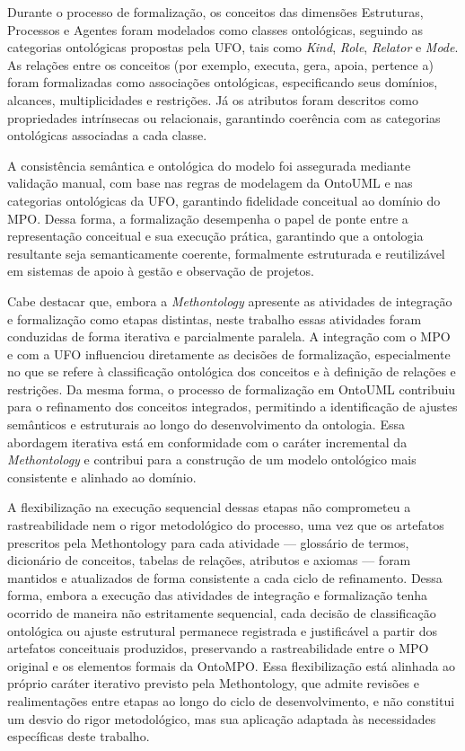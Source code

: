 Durante o processo de formalização, os conceitos das dimensões Estruturas, Processos e Agentes foram modelados como classes ontológicas, seguindo as categorias ontológicas propostas pela UFO, tais como \textit{Kind}, \textit{Role}, \textit{Relator} e \textit{Mode}. As relações entre os conceitos (por exemplo, executa, gera, apoia, pertence a) foram formalizadas como associações ontológicas, especificando seus domínios, alcances, multiplicidades e restrições. Já os atributos foram descritos como propriedades intrínsecas ou relacionais, garantindo coerência com as categorias ontológicas associadas a cada classe.

A consistência semântica e ontológica do modelo foi assegurada mediante validação manual, com base nas regras de modelagem da OntoUML e nas categorias ontológicas da UFO, garantindo fidelidade conceitual ao domínio do MPO. Dessa forma, a formalização desempenha o papel de ponte entre a representação conceitual e sua execução prática, garantindo que a ontologia resultante seja semanticamente coerente, formalmente estruturada e reutilizável em sistemas de apoio à gestão e observação de projetos.

Cabe destacar que, embora a \textit{Methontology} apresente as atividades de integração e formalização como etapas distintas, neste trabalho essas atividades foram conduzidas de forma iterativa e parcialmente paralela. A integração com o MPO e com a UFO influenciou diretamente as decisões de formalização, especialmente no que se refere à classificação ontológica dos conceitos e à definição de relações e restrições. Da mesma forma, o processo de formalização em OntoUML contribuiu para o refinamento dos conceitos integrados, permitindo a identificação de ajustes semânticos e estruturais ao longo do desenvolvimento da ontologia. Essa abordagem iterativa está em conformidade com o caráter incremental da \textit{Methontology} e contribui para a construção de um modelo ontológico mais consistente e alinhado ao domínio.

A flexibilização na execução sequencial dessas etapas não comprometeu a
rastreabilidade nem o rigor metodológico do processo, uma vez que os
artefatos prescritos pela Methontology \cite{fernandez1997methontology} para cada atividade --- glossário
de termos, dicionário de conceitos, tabelas de relações, atributos e
axiomas --- foram mantidos e atualizados de forma consistente a cada
ciclo de refinamento. Dessa forma, embora a execução das atividades de
integração e formalização tenha ocorrido de maneira não estritamente
sequencial, cada decisão de classificação ontológica ou ajuste estrutural
permanece registrada e justificável a partir dos artefatos conceituais
produzidos, preservando a rastreabilidade entre o MPO original e os
elementos formais da OntoMPO. Essa flexibilização está alinhada ao próprio
caráter iterativo previsto pela Methontology, que admite revisões e
realimentações entre etapas ao longo do ciclo de desenvolvimento, e não
constitui um desvio do rigor metodológico, mas sua aplicação adaptada às
necessidades específicas deste trabalho.

